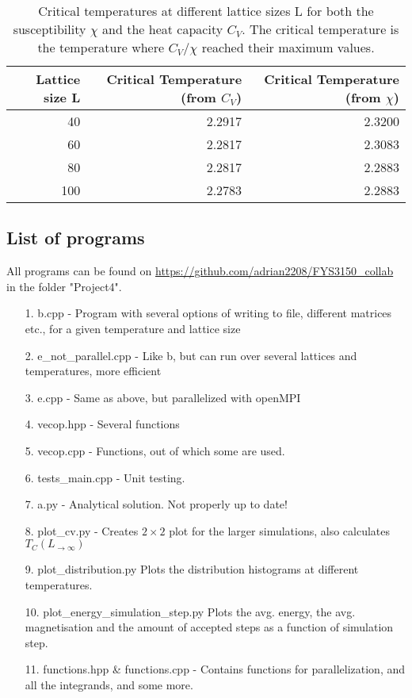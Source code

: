 \documentclass[10pt,a4paper]{article}
\begin{document}
\begin{table}[H]
\centering
\caption[Critical Temperatures]{Critical temperatures at different lattice sizes L for both the susceptibility $\chi$ and the heat capacity $C_V$. The critical temperature is the temperature where $C_V$/$\chi$ reached their maximum values.}
\begin{tabular}{|r|r|r|}
\hline
Lattice size L & Critical Temperature (from $C_V$) & Critical Temperature (from $\chi$) \\ \hline
40             & 2.2917                        & 2.3200                       \\ \hline
60             & 2.2817                        & 2.3083                       \\ \hline
80             & 2.2817                        & 2.2883                       \\ \hline
100            & 2.2783                        & 2.2883                       \\ \hline
\end{tabular}\label{Table of critical temperatures}
\end{table}
\subsection{List of programs}
All programs can be found on \url{https://github.com/adrian2208/FYS3150_collab} in the folder "Project4".


\begin{itemize}
\item[1.] b.cpp - Program with several options of writing to file, different matrices etc., for a given temperature and lattice size
\item[2.] e\_not\_parallel.cpp - Like b, but can run over several lattices and temperatures, more efficient
\item[3.] e.cpp - Same as above, but parallelized with openMPI
\item[4.] vecop.hpp - Several functions
\item[5.] vecop.cpp - Functions, out of which some are used.
\item[6.] tests\_main.cpp - Unit testing.
\item[7.] a.py - Analytical solution. Not properly up to date!
\item[8.] plot\_cv.py - Creates $2\times2$ plot for the larger simulations, also calculates $T_C(L_{\rightarrow \infty})$
\item[9.] plot\_distribution.py Plots the distribution histograms at different temperatures.
\item[10.] plot\_energy\_simulation\_step.py Plots the  avg. energy, the avg. magnetisation and the amount of accepted steps as a function of simulation step.
\item[11.] functions.hpp \& functions.cpp - Contains functions for parallelization, and all the integrands, and some more.
\end{itemize}
\end{document}
